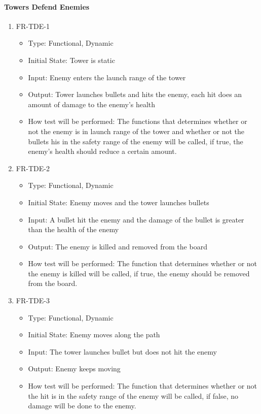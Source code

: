 \documentclass[12,english]{article}
\begin{document}
\paragraph{Towers Defend Enemies}
\begin{enumerate}
  \item FR-TDE-1
  \begin{itemize}
      \item Type: Functional, Dynamic
      \item Initial State: Tower is static 
      \item Input: Enemy enters the launch range of the tower 
      \item Output: Tower launches bullets and hits the enemy, each hit does an amount of damage to the enemy’s health 
      \item How test will be performed: The functions that determines whether or not the enemy is in launch range of the tower and whether or not the bullets his in the safety range of the enemy will be called, if true, the enemy’s health should reduce a certain amount.
  \end{itemize}
  \item FR-TDE-2
  \begin{itemize}
      \item Type: Functional, Dynamic
      \item Initial State: Enemy moves and the tower launches bullets
      \item Input: A bullet hit the enemy and the damage of the bullet is greater than the health of the enemy 
      \item Output: The enemy is killed and removed from the board
      \item How test will be performed: The function that determines whether or not the enemy is killed will be called, if true, the enemy should be removed from the board. 
  \end{itemize}
  \item FR-TDE-3
  \begin{itemize}
      \item Type: Functional, Dynamic
      \item Initial State: Enemy moves along the path
      \item Input: The tower launches bullet but does not hit the enemy 
      \item Output: Enemy keeps moving 
      \item How test will be performed: The function that determines whether or not the hit is in the safety range of the enemy will be called, if false, no damage will be done to the enemy. 
  \end{itemize}
\end{enumerate}
\end{document}
